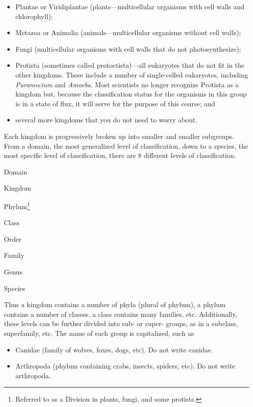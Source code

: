 \documentclass[11pt]{exam}
\begin{document}
\begin{itemize}
\item
  Plantae or Viridiplantae (plants—multicellular organisms with
  cell walls and chlorophyll);
\item
  Metazoa or Animalia (animals—multicellular organisms without cell
  walls);
\item
  Fungi (multicellular organisms with cell walls that do not
  photosynthesize);
\item
  Protista (sometimes called protoctista)—all eukaryotes that do not
  fit in the other kingdoms. These include a number of single-celled
  eukaryotes, including \emph{Paramecium} and \emph{Amoeba}. Most
  scientists no longer recognize Protista as a kingdom but, because the
  classification status for the organisms in this group is in a state of
  flux, it will serve for the purpose of this course; and
\item
  several more kingdoms that you do not need to worry about.
\end{itemize}

Each kingdom is progressively broken up into smaller and smaller
subgroups. From a domain, the most generalized level of classification,
down to a species, the most specific level of classification, there are
8 different levels of classification.

\begin{multicols}{2}
\noindent Domain

\noindent Kingdom

\noindent Phylum\footnote{Referred to as a Division in plants, fungi, and some protists.}

\noindent Class

\noindent Order

\noindent Family

\noindent Genus

\noindent Species
\end{multicols}

Thus a kingdom contains a number of phyla (plural of phylum), a phylum
contains a number of classes, a class contains many families, etc.
Additionally, these levels can be further divided into sub- or super-
groups, as in a subclass, superfamily, etc. The name of each group is
capitalized, such as

\begin{itemize}
	\item Canidae (family of wolves, foxes, dogs, etc). Do not write canidae.

	\item Arthropoda (phylum containing crabs, insects, spiders, etc). Do not
write arthropoda.
\end{itemize}
\end{document}
